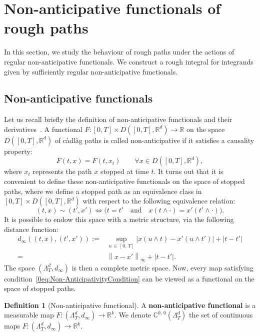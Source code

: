 \documentclass[10pt]{amsart}
\theoremstyle{definition}\newtheorem{defi}[theo]{Definition}\newtheorem{rema}[theo]{Remark}\newtheorem{exam}[theo]{Example}\newtheorem{exem}[theo]{Example}\newtheorem{nota}[theo]{Notation}
\newcommand{\cadlag}{càdlàg }
\newcommand{\bbC}{\mathbb{C}}
\newcommand{\Rr}{{\mathbb{R}}}
\let\oldforall\forall
\renewcommand*{\forall}{\mathrel{\oldforall}}
\begin{document}
\section{Non-anticipative functionals of rough paths}\label{chp:actions}
In this section, we study the behaviour of rough paths under the actions of regular non-anticipative functionals. We construct a rough integral for integrands given by sufficiently regular non-anticipative functionals.

\subsection{Non-anticipative functionals}
Let us recall briefly the definition of non-anticipative functionals and their derivatives~\cite{cont2012}. A functional $F:[0, T] \times D([0, T], \Rr^d) \rightarrow \Rr$ on the space $D([0, T], \Rr^d)$ of \cadlag paths is called non-anticipative if it satisfies a causality property:
\begin{equation}\label{0eq:Non-AnticipativityCondition}
F(t, x) = F(t, {x}_t) \qquad \forall {x} \in D\left([0, T], \Rr^d\right),
\end{equation}
where ${x}_t$ represents the path ${x}$ stopped at time $t$. It turns out that it is convenient to define these non-anticipative functionals on the space of stopped paths, where we define a stopped path as an equivalence class in $[0, T] \times D([0, T], \Rr^d)$ with respect to the following equivalence relation:
\[
(t, {x}) \sim \left(t', {x}'\right) \Longleftrightarrow \big(t = t' \quad \text{and} \quad {x}(t \wedge \cdot) = {x}'\left(t'\wedge \cdot\right)\big).
\]
It is possible to endow this space with a metric structure, via the following distance function:
\begin{align*}
d_\infty\left((t, {x}), \left(t', {x}'\right)\right) :=& \sup_{u\,\in\,[0,\,T]} \left|{x}(u \wedge t) - {x}'\left(u \wedge t'\right)\right| + \left|t - t'\right| \\
=& \left\|{x} - {x}'\right\|_\infty + \left|t-t'\right|.
\end{align*}
The space $(\Lambda_T^d, d_\infty)$ is then a complete metric space. Now, every map satisfying condition~\eqref{0eq:Non-AnticipativityCondition} can be viewed as a functional on the space of stopped paths.
\begin{defi}[Non-anticipative functional] A \textbf{non-anticipa\-tive functional} is a measurable map $F: (\Lambda_T^d, d_\infty) \rightarrow \Rr^k$.
We denote $\bbC^{0,\,0}(\Lambda_T^d)$ the set of continuous maps $F: (\Lambda_T^d, d_\infty) \rightarrow \Rr^k$.
\end{defi}
\end{document}

